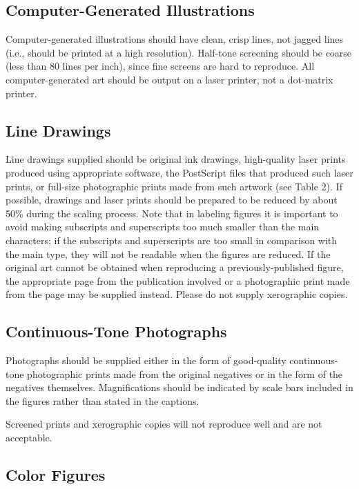 \documentclass[12pt]{book}
\begin{document}
\subsection{Computer-Generated Illustrations}

Computer-generated illustrations should have clean, crisp lines,
not jagged lines (i.e., should be printed at a high resolution).
Half-tone screening should be coarse (less than 80 lines per inch),
since fine screens are hard to reproduce. All computer-generated
art should be output on a laser printer, not a dot-matrix printer.

\subsection{Line Drawings}

Line drawings supplied should be original ink drawings,
high-quality laser prints produced using appropriate software, the
PostScript files that produced such laser prints, or full-size
photographic prints made from such artwork (see Table 2). If
possible, drawings and laser prints should be prepared to be
reduced by about 50\% during the scaling process. Note that in
labeling figures it is important to avoid making subscripts and
superscripts too much smaller than the main characters; if the
subscripts and superscripts are too small in comparison with the
main type, they will not be readable when the figures are reduced.
If the original art cannot be obtained when reproducing a
previously-published figure, the appropriate page from the
publication involved or a photographic print made from the page may
be supplied instead. Please do not supply xerographic copies.

\subsection{Continuous-Tone Photographs}

Photographs should be supplied either in the form of good-quality
continuous-tone photographic prints made from the original
negatives or in the form of the negatives themselves.
Magnifications should be indicated by scale bars included in the
figures rather than stated in the captions.

Screened prints and xerographic copies will not reproduce well and
are not acceptable.

\subsection{Color Figures}
\end{document}
